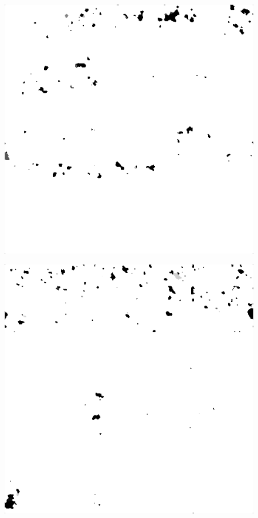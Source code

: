 \begin{figure}[H]
\vspace*{-1.2cm}
\begin{minipage}[t]{0.3\linewidth} %
	\includegraphics[width = 1\linewidth]{gfx/car/car_m5.png}
	\label{fig:car_m5}
\end{minipage}
\begin{minipage}[t]{0.3\linewidth} %
	\includegraphics[width = 1\linewidth]{gfx/hus/hus_m5.png}

\end{minipage}
\end{figure}
